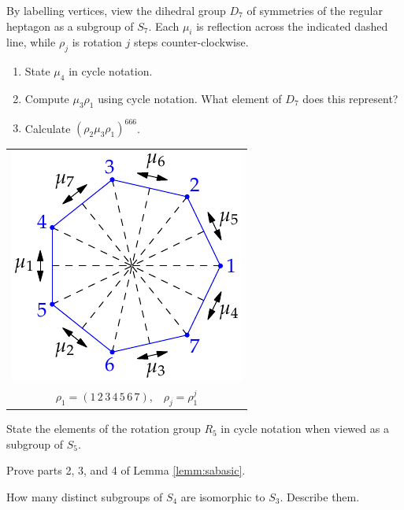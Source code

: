\begin{exercises}
\begin{enumerate}
	
		\begin{minipage}[t]{.6\textwidth}\vspace{0pt}
			\item By labelling vertices, view the dihedral group $D_7$ of symmetries of the regular heptagon as a subgroup of $S_7$. Each $\mu_i$ is reflection across the indicated dashed line, while $\rho_j$ is rotation $j$ steps counter-clockwise.
			\begin{enumerate}
				\item State $\mu_4$ in cycle notation.
				\item Compute $\mu_3\rho_1$ using cycle notation. What element of $D_7$ does this represent?
				\item Calculate $(\rho_2\mu_3\rho_1)^{666}$.
			\end{enumerate}
		\end{minipage}
		\hfill
		\begin{minipage}[t]{.29\textwidth}\vspace{0pt}
			\flushright\begin{tabular}{@{}c@{}}
				\includegraphics{perm-heptagon}\\
				$\rho_1=(1\,2\,3\,4\,5\,6\,7)$,\ \ $\rho_j=\rho_1^j$
			\end{tabular}
		\end{minipage}
		
		
		\item State the elements of the rotation group $R_5$ in cycle notation when viewed as a subgroup of $S_5$.
	  
	  
	  \item Prove parts 2, 3, and 4 of Lemma \ref{lemm:sabasic}.
	  
	  
	  \item How many distinct subgroups of $S_4$ are isomorphic to $S_3$. Describe them.
	  

\end{enumerate}
\end{exercises}
